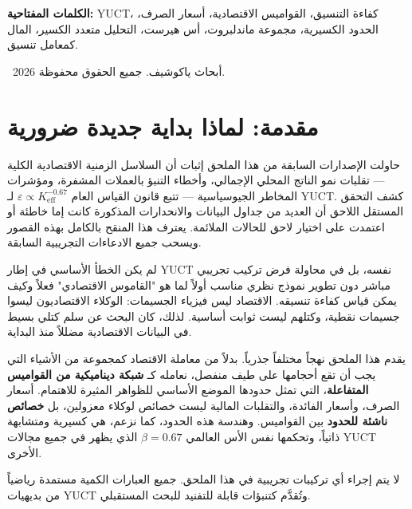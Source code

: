\documentclass[12pt,a4paper]{article}
\theoremstyle{remark}
\begin{document}
\begin{titlepage}
		\vspace{1cm}
		
		\noindent
		\small\textbf{الكلمات المفتاحية:} YUCT، كفاءة التنسيق، القواميس الاقتصادية، أسعار الصرف، الحدود الكسيرية، مجموعة ماندلبروت، أس هيرست، التحليل متعدد الكسير، المال كمعامل تنسيق.
		
		\vspace{0.5cm}
		
		\noindent
		\textcopyright\ 2026 أبحاث ياكوشيف. جميع الحقوق محفوظة.
	\end{titlepage}
	
	\tableofcontents
	\newpage
	
	\section{مقدمة: لماذا بداية جديدة ضرورية}
	
	حاولت الإصدارات السابقة من هذا الملحق إثبات أن السلاسل الزمنية الاقتصادية الكلية — تقلبات نمو الناتج المحلي الإجمالي، وأخطاء التنبؤ بالعملات المشفرة، ومؤشرات المخاطر الجيوسياسية — تتبع قانون القياس العام \(\varepsilon \propto K_{\mathrm{eff}}^{-0.67}\) لـ YUCT. كشف التحقق المستقل اللاحق أن العديد من جداول البيانات والانحدارات المذكورة كانت إما خاطئة أو اعتمدت على اختيار لاحق للحالات الملائمة. يعترف هذا المنقح بالكامل بهذه القصور ويسحب جميع الادعاءات التجريبية السابقة.
	
	لم يكن الخطأ الأساسي في إطار YUCT نفسه، بل في محاولة فرض تركيب تجريبي مباشر دون تطوير نموذج نظري مناسب أولاً لما هو "القاموس الاقتصادي" فعلاً وكيف يمكن قياس كفاءة تنسيقه. الاقتصاد ليس فيزياء الجسيمات: الوكلاء الاقتصاديون ليسوا جسيمات نقطية، وكتلهم ليست ثوابت أساسية. لذلك، كان البحث عن سلم كتلي بسيط في البيانات الاقتصادية مضللاً منذ البداية.
	
	يقدم هذا الملحق نهجاً مختلفاً جذرياً. بدلاً من معاملة الاقتصاد كمجموعة من الأشياء التي يجب أن تقع أحجامها على طيف منفصل، نعامله كـ \textbf{شبكة ديناميكية من القواميس المتفاعلة}، التي تمثل حدودها الموضع الأساسي للظواهر المثيرة للاهتمام. أسعار الصرف، وأسعار الفائدة، والتقلبات المالية ليست خصائص لوكلاء معزولين، بل \textbf{خصائص ناشئة للحدود} بين القواميس. وهندسة هذه الحدود، كما نزعم، هي كسيرية ومتشابهة ذاتياً، وتحكمها نفس الأس العالمي \(\beta = 0.67\) الذي يظهر في جميع مجالات YUCT الأخرى.
	
	لا يتم إجراء أي تركيبات تجريبية في هذا الملحق. جميع العبارات الكمية مستمدة رياضياً من بديهيات YUCT وتُقدَّم كتنبؤات قابلة للتفنيد للبحث المستقبلي.
	
\end{document}
